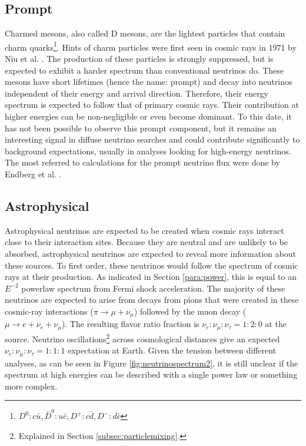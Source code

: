 \subsection{Prompt}
Charmed mesons, also called D mesons, are the lightest particles that contain charm quarks\footnote{$D^0: c\bar{u}, \bar{D}^0: u\bar{c}, D^+: c\bar{d}, D^-: d\bar{c}$}. Hints of charm particles were first seen in cosmic rays in 1971 by Niu et al. \cite{doi:10.1143/PTP.46.1644}. The production of these particles is strongly suppressed, but is expected to exhibit a harder spectrum than conventional neutrinos do. These mesons have short lifetimes (hence the name: prompt) and decay into neutrinos independent of their energy and arrival direction. Therefore, their energy spectrum is expected to follow that of primary cosmic rays. Their contribution at higher energies can be non-negligible or even become dominant. To this date, it has not been possible to observe this prompt component, but it remains an interesting signal in diffuse neutrino searches and could contribute significantly to background expectations, usually in analyses looking for high-energy neutrinos. The most referred to calculations for the prompt neutrino flux were done by Endberg et al. \cite{Enberg:2008te}.
\subsection{Astrophysical}
\label{subsec:astro}
Astrophysical neutrinos are expected to be created when cosmic rays interact close to their interaction sites. Because they are neutral and are unlikely to be absorbed, astrophysical neutrinos are expected to reveal more information about these sources. To first order, these neutrinos would follow the spectrum of cosmic rays at their production. As indicated in Section \ref{para:power}, this is equal to an $E^{-2}$ powerlaw spectrum from Fermi shock acceleration. The majority of these neutrinos are expected to arise from decays from pions that were created in these cosmic-ray interactions ($\pi \rightarrow \mu + \nu_\mu$) followed by the muon decay ($\mu \rightarrow e + \nu_e + \nu_\mu$). The resulting flavor ratio fraction is $\nu_e: \nu_\mu: \nu_\tau = 1:2:0$ at the source. Neutrino oscillations\footnote{Explained in Section \ref{subsec:particlemixing}.} across cosmological distances give an expected $\nu_e: \nu_\mu: \nu_\tau = 1:1:1$ expectation at Earth. Given the tension between different analyses, as can be seen in Figure \ref{fig:neutrinospectrum2}, it is still unclear if the spectrum at high energies can be described with a single power law or something more complex.

